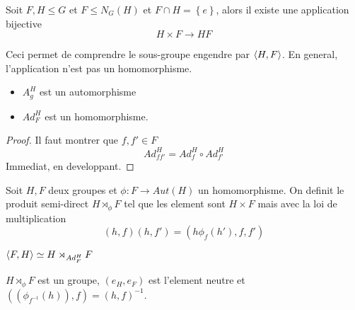 \documentclass[../main.tex]{subfiles}
\begin{document}
\begin{propo}
	Soit $F,H \leq G$ et $F \leq N_G( H) $ et $F \cap H= \left\{ e   \right\} $, alors il existe une application bijective 
	\[ 
	H \times F \to HF
	\]
	
	Ceci permet de comprendre le sous-groupe engendre par $\left\langle H,F\right\rangle$.
	En general, l'application n'est pas un homomorphisme.
\end{propo}
\begin{lemma}
\begin{itemize}
\item $A_g^{H}$ est un automorphisme
\item $Ad_{F} ^{H}$ est un homomorphisme.
\end{itemize}
\end{lemma}
\begin{proof}
Il faut montrer que $f, f' \in F$ 
\[ 
Ad_{f f'} ^{H} = Ad_{f} ^{H}\circ Ad_{f'} ^{H}
\]
Immediat, en developpant.
\end{proof}
\begin{defn}
	Soit $H,F$ deux groupes et $\phi: F \to Aut( H) $ un homomorphisme.
	On definit le produit semi-direct $H \rtimes_\phi F$ tel que les element sont $H \times F$ mais avec la loi de multiplication 
	\[ 
		( h,f) ( h,f') = ( h\phi_f( h') ,f,f') 
	\]
	
\end{defn}
\begin{thm}
	$\left\langle F,H\right\rangle \simeq H \rtimes_{Ad_{F} ^{H}} F$
\end{thm}
\begin{lemma}
	$H\rtimes_\phi F$ est un groupe, $( e_H, e_F) $ est l'element neutre et $\left(( \phi_{f^{-1}} ( h) ) , f \right) = ( h,f) ^{-1} $.\\

\end{lemma}
\end{document}
